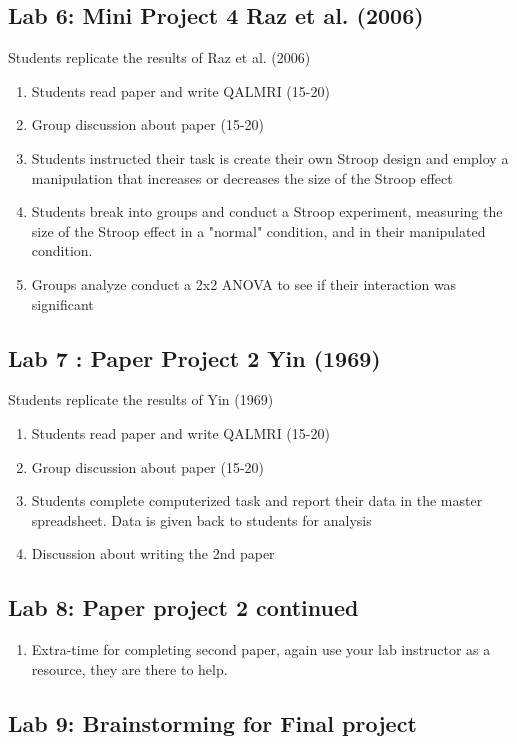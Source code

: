 \subsection{Lab 6: Mini Project 4 Raz et al. (2006)}
Students replicate the results of Raz et al. (2006) \cite{raz_suggestion_2006}
\begin{enumerate}
\item Students read paper and write QALMRI (15-20)
\item	Group discussion about paper (15-20)
\item	Students instructed their task is create their own Stroop design and employ a manipulation that increases or decreases the size of the Stroop effect
\item	Students break into groups and conduct a Stroop experiment, measuring the size of the Stroop effect in a "normal" condition, and in their manipulated condition.
\item	Groups analyze conduct a 2x2 ANOVA to see if their interaction was significant
\end{enumerate}


\subsection{Lab 7 : Paper Project 2 Yin (1969)}
Students replicate the results of Yin (1969) \cite{yin_looking_1969}
\begin{enumerate}
\item Students read paper and write QALMRI (15-20)
\item	Group discussion about paper (15-20)
\item	Students complete computerized task and report their data in the master spreadsheet. Data is given back to students for analysis
\item	Discussion about writing the 2nd paper
\end{enumerate}

\subsection{Lab 8: Paper project 2 continued}
\begin{enumerate}
\item Extra-time for completing second paper, again use your lab instructor as a resource, they are there to help.
\end{enumerate}


\subsection{Lab 9: Brainstorming for Final project}

